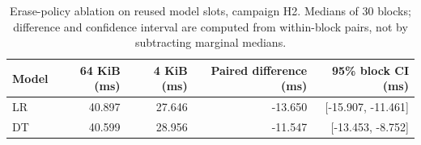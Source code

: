 \begin{table}[!htbp]
\caption{Erase-policy ablation on reused model slots, campaign H2. Medians of 30 blocks; difference and confidence interval are computed from within-block pairs, not by subtracting marginal medians.}\label{tab:erase-ablation}
\centering\small
\begin{tabular}{lrrrr}
\toprule Model & 64 KiB (ms) & 4 KiB (ms) & Paired difference (ms) & 95\% block CI (ms)\\\midrule
LR & 40.897 & 27.646 & -13.650 & [-15.907, -11.461]\\
DT & 40.599 & 28.956 & -11.547 & [-13.453, -8.752]\\
\bottomrule\end{tabular}\end{table}
